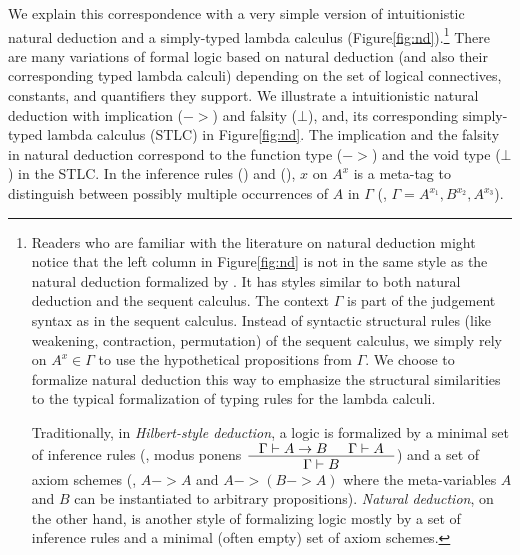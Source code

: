 We explain this correspondence with a very simple
version of intuitionistic natural deduction and
a simply-typed lambda calculus (Figure\;\ref{fig:nd}).\footnote{
        Readers who are familiar with the literature on natural deduction
        might notice that the left column in Figure\;\ref{fig:nd} is not in
        the same style as the natural deduction formalized by
        \citet{Gentzen35,Gentzen69}. It has styles similar to
        both natural deduction and the sequent calculus. The context $\Gamma$
        is part of the judgement syntax as in the sequent calculus. Instead
        of syntactic structural rules (like weakening,
        contraction, permutation) of the sequent calculus, we simply rely on
        $A^x \in \Gamma$ to use the hypothetical propositions from $\Gamma$.
        We choose to formalize natural deduction this way to emphasize
        the structural similarities to the typical formalization
        of typing rules for the lambda calculi.

	Traditionally, in \emph{Hilbert-style deduction}, a logic is formalized
	by a minimal set of inference rules (\eg, modus ponens
	$\inference{\Gamma |- A -> B & \Gamma |- A}{\Gamma |- B}$)
	and a set of axiom schemes (\eg, $A -> A$ and $A -> (B -> A)$ where
	the meta-variables $A$ and $B$ can be instantiated to arbitrary
	propositions).
	\emph{Natural deduction}, on the other hand, is another style of
	formalizing logic mostly by a set of inference rules and a minimal
	(often empty) set of axiom schemes.
	}
There are many variations of formal logic based on natural deduction
(and also their corresponding typed lambda calculi) depending on
the set of logical connectives, constants, and quantifiers they support.
We illustrate a intuitionistic natural deduction with implication ($->$) and
falsity ($\bot$), and, its corresponding simply-typed lambda calculus (STLC)
in Figure\;\ref{fig:nd}. The implication and the falsity in natural deduction
correspond to the function type ($->$) and the void type ($\bot$) in the STLC.
In the inference rules () and (),
$x$ on $A^x$ is a meta-tag to distinguish between possibly multiple
occurrences of $A$ in $\Gamma$ (\eg, $\Gamma = A^{x_1},B^{x_2},A^{x_3}$).

